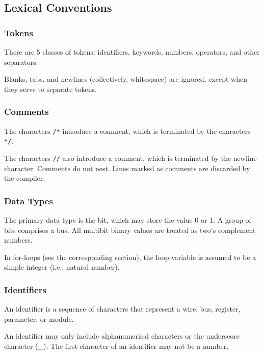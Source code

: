 \documentclass[letterpaper,11pt]{article}
\begin{document}
    \subsection{Lexical Conventions}
        \subsubsection{Tokens}
        There are 5 classes of tokens: identifiers, keywords, numbers, operators, and other separators.
        
        Blanks, tabs, and newlines (collectively, whitespace) are ignored, except when they serve
        to separate tokens.
        
        \subsubsection{Comments}
        The characters \texttt{/*} introduce a comment, which is terminated by the characters \texttt{*/}.
        
        The characters \texttt{//} also introduce a comment, which is terminated by the newline character. Comments do not 
        nest. Lines marked as comments are discarded by the compiler.
        
        \subsubsection{Data Types}
        The primary data type is the bit, which may store the value 0 or 1. A group of bits comprises a bus. All 
        multibit binary values are treated as two's complement numbers.
        
        In for-loops (see the corresponding section), the loop variable is assumed to be a simple integer (i.e., 
        natural number).
        
        \subsubsection{Identifiers}
        An identifier is a sequence of characters that represent a wire, bus, register, parameter, or module. 
        
        An identifier may only include alphanumerical characters or the underscore character (\_). The first character 
        of an identifier may not be a number.
        
\end{document}
